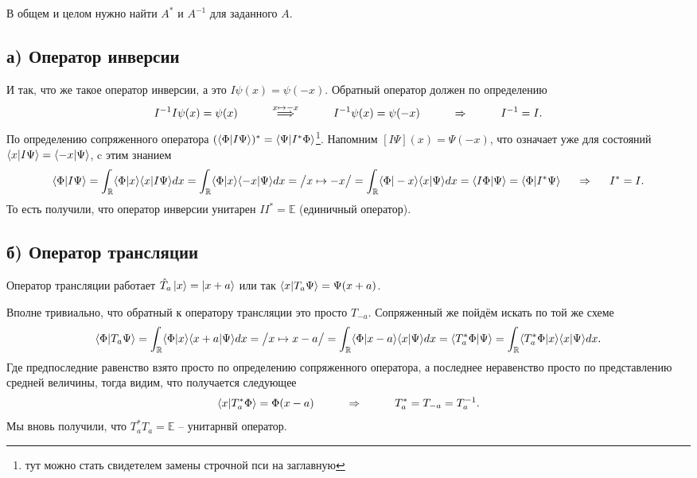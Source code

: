В общем и целом нужно найти $A^*$ и $A^{-1}$ для заданного $A$. 
\subsection*{а) Оператор инверсии}
И так, что же такое оператор инверсии, а это $I \psi(x) = \psi(-x)$.
Обратный оператор должен по определению
\begin{equation*}
	I^{-1} I \psi(x) = \psi(x)
	\hspace{1 cm}
	\overset{x \mapsto -x}{\Longrightarrow}
	\hspace{1 cm}
	I^{-1} \psi(x) = \psi(-x)
	\hspace{1 cm}
	\Rightarrow
	\hspace{1 cm}
	I^{-1} = I.
\end{equation*}
По определению сопряженного оператора $(\bk{\Phi}{I \Psi})^* = \bk{\Psi}{I^* \Phi}$\footnote{тут можно стать свидетелем замены строчной пси на заглавную}.
Напомним
$[I\Psi](x) = \Psi(-x)$, что означает уже для состояний $\bk{x}{I \Psi} = \bk{- x}{\Psi}$, c этим знанием
\begin{equation*}
	\bk{\Phi}{I \Psi} = \int_{\mathbb{R}} \bk{\Phi}{x} \bk{x}{I \Psi} d x
	=
	\int_{\mathbb{R}} \bk{\Phi}{x}\bk{-x}{\Psi} d x =\big/ x \mapsto - x \big/ =  \int_{\mathbb{R}} \bk{\Phi}{- x}\bk{x}{\Psi} d x
	=
	\bk{I \Phi}{\Psi} = \bk{\Phi}{I^* \Psi}
	\hspace{0.5 cm}
	\Rightarrow
	\hspace{0.5 cm}
	I^{*} = I.
\end{equation*}
То есть получили, что оператор инверсии унитарен $I I^* = \mathbb{E}$ (единичный оператор).

\subsection*{б) Оператор трансляции}
Оператор трансляции работает $\hat{T}_a \left| x \right\rangle = \left| x+a \right\rangle$ или так $\bk{x}{T_a\Psi} = \Psi(x + a)$.

Вполне тривиально, что обратный к оператору трансляции это просто $T_{-a}$. Сопряженный же пойдём искать по той же схеме
\begin{equation*}
	\bk{\Phi}{T_a \Psi} = \int_{\mathbb{R}} \bk{\Phi}{x} \bk{x+a}{\Psi} d x 
	= 
	\big/ x \mapsto x - a\big/
	=
	\int_{\mathbb{R}} \bk{\Phi}{x-a} \bk{x}{\Psi} d x 
	=
	\bk{T_a^{*}\Phi}{\Psi}
	=
	\int_{\mathbb{R}} \bk{T_a^{*}\Phi}{x} \bk{x}{\Psi} d x. 
\end{equation*}
Где предпоследние равенство взято просто по определению сопряженного оператора, а последнее неравенство просто по представлению средней величины, тогда видим, что получается следующее
\begin{align*}
	\bk{x}{T_a^* \Phi} = \Phi(x-a)
	\hspace{1 cm}
	\Rightarrow
	\hspace{1 cm}
	T_a^* = T_{-a} = T_a^{-1}.
\end{align*}
Мы вновь получили, что $T_a^* T_a = \mathbb{E}$ -- унитарнвй оператор.
